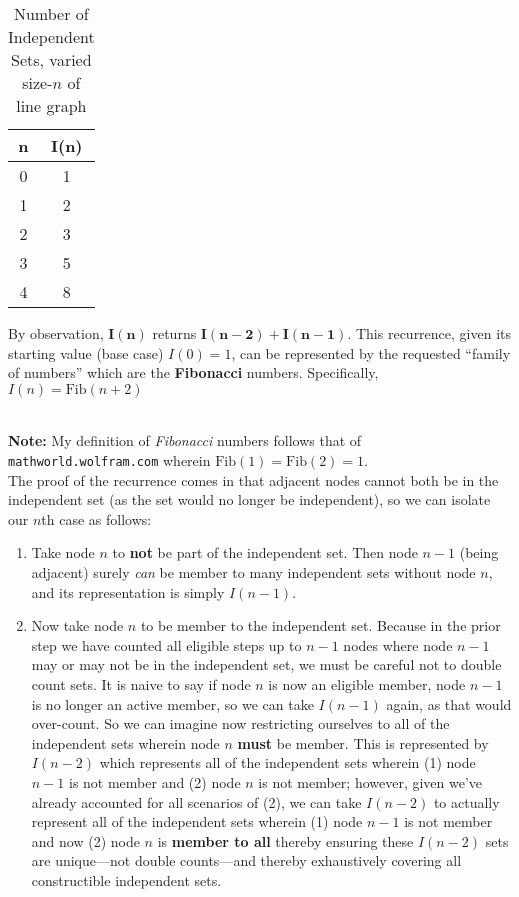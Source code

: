 \documentclass[conference]{styles/acmsiggraph}
\newcommand{\?}{\stackrel{?}{=}}
\DeclareRobustCommand{\mybox}[2][gray!20]{%
\begin{tcolorbox}[   %
        breakable,
        left=0pt,
        right=0pt,
        top=0pt,
        bottom=0pt,
        colback=#1,
        colframe=#1,
        width=\dimexpr\textwidth\relax, 
        enlarge left by=0mm,
        boxsep=5pt,
        arc=0pt,outer arc=0pt,
        ]
        #2
\end{tcolorbox}
}
\begin{document}
\begin{table}[htbp]
  \centering
    \begin{tabular}{c|c}
    \multicolumn{1}{c}{n} & I(n) \\
    \midrule
    0     & 1 \\
    1     & 2 \\
    2     & 3 \\
    3     & 5 \\
    4     & 8 \\
    \end{tabular}%
    \caption{Number of Independent Sets, varied size-$n$ of line graph}
  \label{tab:line}%
\end{table}%
\FloatBarrier

\mybox{
By observation, $\mathbf{I(n)}$ returns $\mathbf{I(n-2) + I(n-1)}$.  This recurrence, given its starting value (base case) $I(0) = 1$, can be represented by the requested \enquote{family of numbers} which are the \textbf{Fibonacci} numbers.  Specifically, $I(n) = \text{Fib}(n+2)$
}\\

\textbf{Note:} My definition of \textit{Fibonacci} numbers follows that of \verb|mathworld.wolfram.com| wherein $\text{Fib}(1) = \text{Fib}(2) = 1$.\\

The proof of the recurrence comes in that adjacent nodes cannot both be in the independent set (as the set would no longer be independent), so we can isolate our $n$th case as follows:
\begin{enumerate}
    \item Take node $n$ to \textbf{not} be part of the independent set.  Then node $n-1$ (being adjacent) surely \textit{can} be member to many independent sets without node $n$, and its representation is simply $I(n-1)$.
    \item Now take node $n$ to be member to the independent set.  Because in the prior step we have counted all eligible steps up to $n-1$ nodes where node $n-1$ may or may not be in the independent set, we must be careful not to double count sets.  It is naive to say if node $n$ is now an eligible member, node $n-1$ is no longer an active member, so we can take $I(n-1)$ again, as that would over-count.  So we can imagine now restricting ourselves to all of the independent sets wherein node $n$ \textbf{must} be member.  This is represented by $I(n-2)$ which represents all of the independent sets wherein (1) node $n-1$ is not member and (2) node $n$ is not member; however, given we've already accounted for all scenarios of (2), we can take $I(n-2)$ to actually represent all of the independent sets wherein (1) node $n-1$ is not member and now (2) node $n$ is \textbf{member to all} thereby ensuring these $I(n-2)$ sets are unique---not double counts---and thereby exhaustively covering all constructible independent sets.
\end{enumerate}
\end{document}
